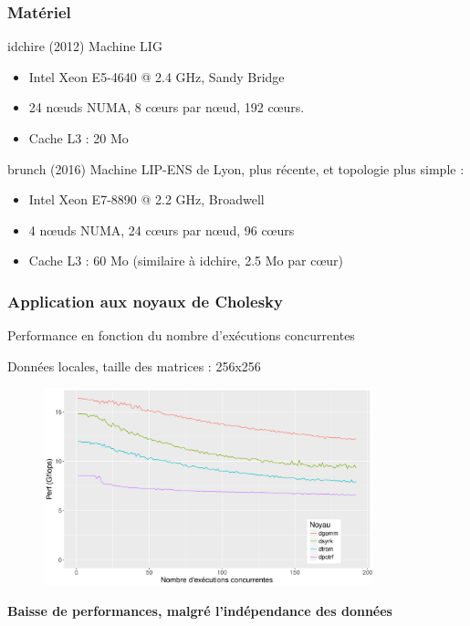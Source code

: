 \documentclass[xcolor={usenames,dvipsnames,svgnames,table}, aspectratio=43]{beamer}
\begin{document}
\begin{frame}
  \frametitle{Matériel}

  \begin{block}{idchire (2012)}
    Machine LIG
    \begin{itemize}
      \item Intel Xeon E5-4640 @ 2.4 GHz, Sandy Bridge
      \item 24 nœuds NUMA, 8 cœurs par nœud, 192 cœurs.
      \item Cache L3 : 20 Mo
    \end{itemize}
  \end{block}

  \begin{block}{brunch (2016)}
    Machine LIP-ENS de Lyon, plus récente, et topologie plus simple :
    \begin{itemize}
      \item Intel Xeon E7-8890 @ 2.2 GHz, Broadwell
      \item 4 nœuds NUMA, 24 cœurs par nœud, 96 cœurs
      \item Cache L3 : 60 Mo (similaire à idchire, 2.5 Mo par cœur)
    \end{itemize}
  \end{block}

\end{frame}



\begin{frame}
\frametitle{Application aux noyaux de Cholesky}

Performance en fonction du nombre d'exécutions concurrentes

Données locales, taille des matrices : 256x256
\begin{figure}
  \centering
  \includegraphics[width=0.85\textwidth]{graph/kernel_256_local_idchire.pdf}
\end{figure}

\textbf{Baisse de performances, malgré l'indépendance des données}

\end{frame}
\end{document}
